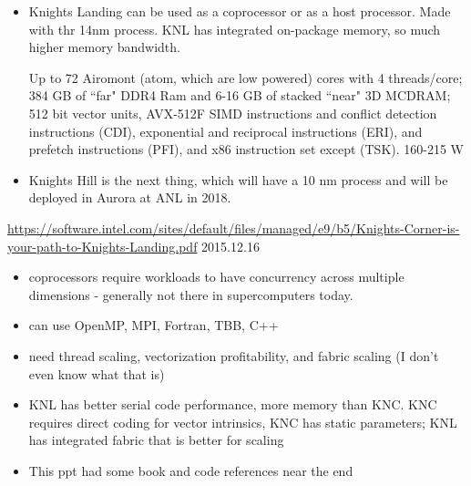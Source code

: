 \documentclass[12pt,twoside]{article}
\begin{document}
\begin{itemize}
\item Knights Landing can be used as a coprocessor or as a host processor. Made with thr 14nm process. KNL has integrated on-package memory, so much higher memory bandwidth. 

Up to 72 Airomont (atom, which are low powered) cores with 4 threads/core; 384 GB of ``far" DDR4 Ram and 6-16 GB of stacked ``near" 3D MCDRAM; 512 bit vector units, AVX-512F SIMD instructions and conflict detection instructions (CDI), exponential and reciprocal instructions (ERI), and prefetch instructions (PFI), and x86 instruction set except (TSK). 160-215 W

\item Knights Hill is the next thing, which will have a 10 nm process and will be deployed in Aurora at ANL in 2018. 
\end{itemize}

\href{https://software.intel.com/sites/default/files/managed/e9/b5/Knights-Corner-is-your-path-to-Knights-Landing.pdf}{https://software.intel.com/sites/default/files/managed/e9/b5/Knights-Corner-is-your-path-to-Knights-Landing.pdf} 2015.12.16
\begin{itemize}
\item coprocessors require workloads to have concurrency across multiple dimensions - generally not there in supercomputers today.
\item can use OpenMP, MPI, Fortran, TBB, C++
\item need thread scaling, vectorization profitability, and fabric scaling (I don't even know what that is)
\item KNL has better serial code performance, more memory than KNC. KNC requires direct coding for vector intrinsics, KNC has static parameters; KNL has integrated fabric that is better for scaling
\item This ppt had some book and code references near the end
\end{itemize}
\end{document}
